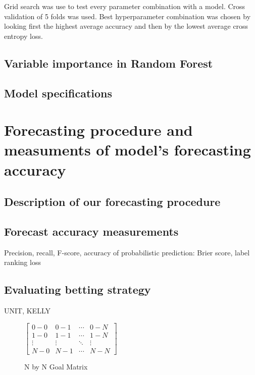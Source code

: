 Grid search was use to test every parameter combination with a model. Cross validation of 5 folds was used. Best hyperparameter combination was chosen by looking first the highest average accuracy and then by the lowest average cross entropy loss.


\subsection{Variable importance in Random Forest}
\subsection{Model specifications}
\section{Forecasting procedure and measuments of model's forecasting accuracy}
\subsection{Description of our forecasting procedure}
\subsection{Forecast accuracy measurements}
Precision, recall, F-score, accuracy of probabilistic prediction: Brier score, label ranking loss
\subsection{Evaluating betting strategy}
UNIT, KELLY




\begin{figure}
    $\begin{bmatrix}
    0-0 & 0-1 & \cdots & 0-N \\
    1-0 & 1-1 & \cdots   &1-N \\
    \vdots & \vdots   & \ddots & \vdots \\
    N-0 & N-1 & \cdots & N-N\end{bmatrix}$
\caption{N by N Goal Matrix}
\end{figure}